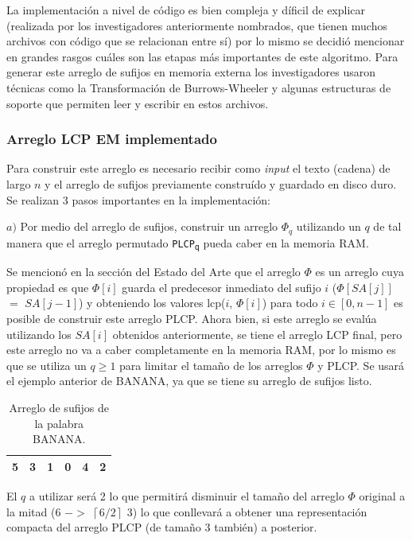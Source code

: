 La implementación a nivel de código es bien compleja y díficil de explicar (realizada por los investigadores anteriormente nombrados, que tienen muchos archivos con código que se relacionan entre sí) por lo mismo se decidió mencionar en grandes rasgos cuáles son las etapas más importantes de este algoritmo. Para generar este arreglo de sufijos en memoria externa los investigadores usaron técnicas como la Transformación de Burrows-Wheeler y algunas estructuras de soporte que permiten leer y escribir en estos archivos.

\subsubsection{Arreglo LCP EM implementado}

Para construir este arreglo es necesario recibir como \textit{input} el texto (cadena) de largo $n$ y el arreglo de sufijos previamente construído y guardado en disco duro. Se realizan 3 pasos importantes en la implementación:

$a)$ Por medio del arreglo de sufijos, construir un arreglo $\Phi_{q}$ utilizando un $q$ de tal manera que el arreglo permutado \texttt{PLCP\textsubscript{q}} pueda caber en la memoria RAM.

Se mencionó en la sección del Estado del Arte que el arreglo $\Phi$ es un arreglo cuya propiedad es que $\Phi[i]$ guarda el predecesor inmediato del sufijo $i$ ($\Phi[SA[j]]$ $=$ $SA[j-1]$) y obteniendo los valores lcp($i$, $\Phi[i]$) para todo $i \in [0,n-1]$ es posible de construir este arreglo PLCP. Ahora bien, si este arreglo se evalúa utilizando los $SA[i]$ obtenidos anteriormente, se tiene el arreglo LCP final, pero este arreglo no va a caber completamente en la memoria RAM, por lo mismo es que se utiliza un $q \geq 1$ para limitar el tamaño de los arreglos $\Phi$ y PLCP. Se usará el ejemplo anterior de BANANA, ya que se tiene su arreglo de sufijos listo.

\begin{table}[!htb]
\centering
\begin{tabular}{|c|c|c|c|c|c|}
\hline
5 & 3 & 1 & 0 & 4 & 2 \\ \hline
\end{tabular}
\caption{Arreglo de sufijos de la palabra BANANA.}
\end{table}

El $q$ a utilizar será 2 lo que permitirá disminuir el tamaño del arreglo $\Phi$ original a la mitad (6 $->$ $\left \lceil{6/2}\right \rceil$ 3) lo que conllevará a obtener una representación compacta del arreglo PLCP (de tamaño 3 también) a posterior.

